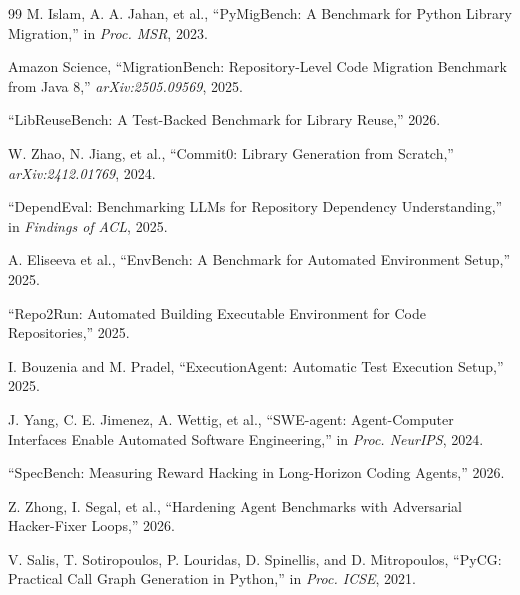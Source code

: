 \documentclass[10pt,conference]{IEEEtran}
\begin{document}
\begin{thebibliography}{99}
M. Islam, A. A. Jahan, et al., ``PyMigBench: A Benchmark for Python
Library Migration,'' in \emph{Proc. MSR}, 2023.

Amazon Science, ``MigrationBench: Repository-Level Code Migration
Benchmark from Java 8,'' \emph{arXiv:2505.09569}, 2025.

``LibReuseBench: A Test-Backed Benchmark for Library Reuse,'' 2026.

W. Zhao, N. Jiang, et al., ``Commit0: Library Generation from Scratch,''
\emph{arXiv:2412.01769}, 2024.

``DependEval: Benchmarking LLMs for Repository Dependency
Understanding,'' in \emph{Findings of ACL}, 2025.

A. Eliseeva et al., ``EnvBench: A Benchmark for Automated Environment
Setup,'' 2025.

``Repo2Run: Automated Building Executable Environment for Code
Repositories,'' 2025.

I. Bouzenia and M. Pradel, ``ExecutionAgent: Automatic Test Execution
Setup,'' 2025.

J. Yang, C. E. Jimenez, A. Wettig, et al., ``SWE-agent: Agent-Computer
Interfaces Enable Automated Software Engineering,'' in \emph{Proc.
NeurIPS}, 2024.

``SpecBench: Measuring Reward Hacking in Long-Horizon Coding Agents,''
2026.

Z. Zhong, I. Segal, et al., ``Hardening Agent Benchmarks with Adversarial
Hacker-Fixer Loops,'' 2026.

V. Salis, T. Sotiropoulos, P. Louridas, D. Spinellis, and D. Mitropoulos,
``PyCG: Practical Call Graph Generation in Python,'' in \emph{Proc.
ICSE}, 2021.

\end{thebibliography}
\end{document}
